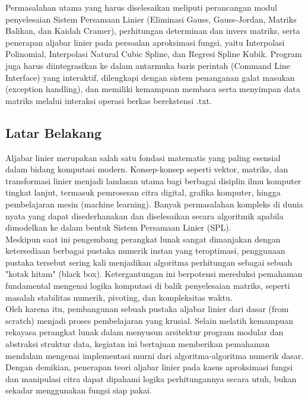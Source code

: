 \documentclass[12pt]{article}
\begin{document}
\noindent Permasalahan utama yang harus diselesaikan meliputi perancangan modul penyelesaian Sistem Persamaan Linier (Eliminasi Gauss, Gauss-Jordan, Matriks Balikan, dan Kaidah Cramer), perhitungan determinan dan invers matriks, serta penerapan aljabar linier pada persoalan aproksimasi fungsi, yaitu Interpolasi Polinomial, Interpolasi Natural Cubic Spline, dan Regresi Spline Kubik. Program juga harus diintegrasikan ke dalam antarmuka baris perintah (Command Line Interface) yang interaktif, dilengkapi dengan sistem penanganan galat masukan (exception handling), dan memiliki kemampuan membaca serta menyimpan data matriks melalui interaksi operasi berkas berekstensi .txt.

\subsection{Latar Belakang}
Aljabar linier merupakan salah satu fondasi matematis yang paling esensial dalam bidang komputasi modern. Konsep-konsep seperti vektor, matriks, dan transformasi linier menjadi landasan utama bagi berbagai disiplin ilmu komputer tingkat lanjut, termasuk pemrosesan citra digital, grafika komputer, hingga pembelajaran mesin (machine learning). Banyak permasalahan kompleks di dunia nyata yang dapat disederhanakan dan diselesaikan secara algoritmik apabila dimodelkan ke dalam bentuk Sistem Persamaan Linier (SPL).
\\

\noindent Meskipun saat ini pengembang perangkat lunak sangat dimanjakan dengan ketersediaan berbagai pustaka numerik instan yang teroptimasi, penggunaan pustaka tersebut sering kali menjadikan algoritma perhitungan sebagai sebuah "kotak hitam" (black box). Ketergantungan ini berpotensi mereduksi pemahaman fundamental mengenai logika komputasi di balik penyelesaian matriks, seperti masalah stabilitas numerik, pivoting, dan kompleksitas waktu.
\\

\noindent Oleh karena itu, pembangunan sebuah pustaka aljabar linier dari dasar (from scratch) menjadi proses pembelajaran yang krusial. Selain melatih kemampuan rekayasa perangkat lunak dalam menyusun arsitektur program modular dan abstraksi struktur data, kegiatan ini bertujuan memberikan pemahaman mendalam mengenai implementasi murni dari algoritma-algoritma numerik dasar. Dengan demikian, penerapan teori aljabar linier pada kasus aproksimasi fungsi dan manipulasi citra dapat dipahami logika perhitungannya secara utuh, bukan sekadar menggunakan fungsi siap pakai.
\end{document}
